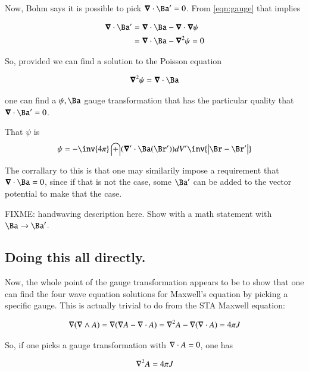\documentclass{article}
\begin{document}
Now, Bohm says it is possible to pick $\spacegrad \cdot \Ba' = 0$.  From \ref{eqn:gauge} that implies

\begin{align*}
\spacegrad \cdot \Ba'
&= \spacegrad \cdot \Ba - \spacegrad \cdot \spacegrad \psi \\
&= \spacegrad \cdot \Ba - \spacegrad^2 \psi = 0 \\
\end{align*}

So, provided we can find a solution to the Poisson equation

\begin{align}\label{eqn:psiForDivAPrimeEqZero}
\spacegrad^2 \psi = \spacegrad \cdot \Ba
\end{align}

one can find a $\psi, \Ba$ gauge transformation that has the particular quality that $\spacegrad \cdot \Ba' = 0$.

That $\psi$ is
\begin{align*}
\psi = -\inv{4\pi}\int (\spacegrad' \cdot \Ba(\Br')) dV' \inv{\Abs{\Br-\Br'}}
\end{align*}

The corrallary to this
is that one may similarily impose a requirement that $\spacegrad \cdot \Ba = 0$, since if that is not the case, some $\Ba'$ can be added to the vector potential to make that the case.

FIXME: handwaving description here.  Show with a math statement with $\Ba \rightarrow \Ba'$.

\subsection{ Doing this all directly. }

Now, the whole point of the gauge transformation appears to be to show that one can find the four wave equation solutions for 
Maxwell's equation by picking a specific gauge.  This is actually trivial to do from the STA Maxwell equation:

\begin{align*}
\nabla (\nabla \wedge A) = \nabla( \nabla A - \nabla \cdot A ) = \nabla^2 A - \nabla (\nabla \cdot A) = 4 \pi J
\end{align*}

So, if one picks a gauge transformation with $\nabla \cdot A = 0$, one has

\begin{align*}
\nabla^2 A = 4 \pi J
\end{align*}
\end{document}
